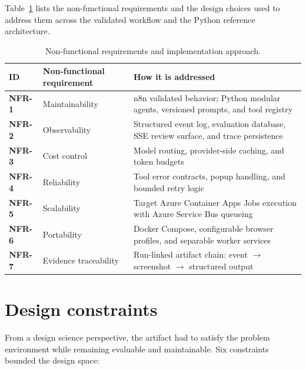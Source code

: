 Table~\ref{tab:nfr-summary} lists the non-functional requirements and the design choices
used to address them across the validated workflow and the Python reference architecture.

\begin{table}[H]
\centering
\begin{tabularx}{\textwidth}{>{\raggedright\arraybackslash\bfseries}p{1.7cm}
                              >{\raggedright\arraybackslash}X
                              >{\raggedright\arraybackslash}p{4.2cm}}
\toprule
\rowcolor{accent!8}
ID & Non-functional requirement & How it is addressed \\
\midrule
NFR-1 & Maintainability & n8n validated behavior; Python modular agents, versioned
  prompts, and tool registry \\
NFR-2 & Observability & Structured event log, evaluation database, SSE review surface,
  and trace persistence \\
NFR-3 & Cost control & Model routing, provider-side caching, and token budgets \\
NFR-4 & Reliability & Tool error contracts, popup handling, and bounded retry logic \\
NFR-5 & Scalability & Target Azure Container Apps Jobs execution with Azure Service Bus
  queueing \\
NFR-6 & Portability & Docker Compose, configurable browser profiles, and separable
  worker services \\
NFR-7 & Evidence traceability & Run-linked artifact chain: event $\to$ screenshot $\to$
  structured output \\
\bottomrule
\end{tabularx}
\caption{Non-functional requirements and implementation approach.}
\label{tab:nfr-summary}
\end{table}

\section{Design constraints}

From a design science perspective, the artifact had to satisfy the problem environment
while remaining evaluable and maintainable. Six constraints bounded the design space:

